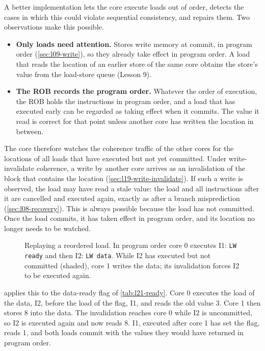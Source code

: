 \documentclass[../main.tex]{subfiles}
\begin{document}
A better implementation lets the core execute loads out of order, detects the
cases in which this could violate sequential consistency, and repairs them.
Two observations make this possible.
\begin{itemize}
  \item \textbf{Only loads need attention.}  Stores write memory at commit, in
    program order (\cref{sec:l09-write}), so they already take effect in
    program order.  A load that reads the location of an earlier store of the
    same core obtains the store's value from the load-store queue (Lesson 9).
  \item \textbf{The ROB records the program order.}  Whatever the order of
    execution, the ROB holds the instructions in program order, and a load
    that has executed early can be regarded as taking effect when it commits.
    The value it read is correct for that point unless another core has
    written the location in between.
\end{itemize}
The core therefore watches the coherence traffic of the other cores for the
locations of all loads that have executed but not yet committed.  Under
write-invalidate coherence, a write by another core arrives as an
invalidation of the block that contains the location
(\cref{sec:l19-write-invalidate}).  If such a write is observed, the load may
have read a stale value: the load and all instructions after it are cancelled
and executed again, exactly as after a branch misprediction
(\cref{sec:l08-recovery}).  This is always
possible because the load has not
committed.  Once the load commits, it has taken effect in program order, and
its location no longer needs to be watched.

\begin{figure}[htbp]
  \centering
  
  \caption{Replaying a reordered load.  In program order core 0 executes I1:
    \texttt{LW ready} and then I2: \texttt{LW data}.  While I2 has executed
    but not committed (shaded), core 1 writes the data; its invalidation forces
    I2 to be executed again.}
  \label{fig:l21-replay}
\end{figure}

 applies this to the data-ready flag of
\cref{tab:l21-ready}.  Core 0 executes the load of the data, I2, before the
load of the flag, I1, and reads the old value 3.  Core 1 then stores 8 into
the data.  The invalidation reaches core 0 while I2 is uncommitted, so I2 is
executed again and now reads 8.  I1, executed after core 1 has set the flag,
reads 1, and both loads commit with the values they would have returned in
program order.
\end{document}
